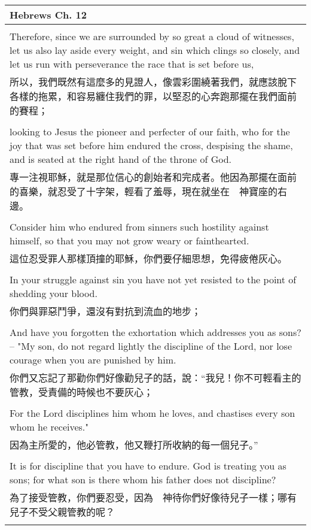 \documentclass{book}
\begin{document}
\begin{tabularx}{\textwidth}{p{}}
\hline
Hebrews Ch. 12 \\
\hline \\
Therefore, since we are surrounded by so great a cloud of witnesses, let us also lay aside every weight, and sin which clings so closely, and let us run with perseverance the race that is set before us, \\
所以，我們既然有這麼多的見證人，像雲彩圍繞著我們，就應該脫下各樣的拖累，和容易纏住我們的罪，以堅忍的心奔跑那擺在我們面前的賽程； \\ \\
looking to Jesus the pioneer and perfecter of our faith, who for the joy that was set before him endured the cross, despising the shame, and is seated at the right hand of the throne of God. \\
專一注視耶穌，就是那位信心的創始者和完成者。他因為那擺在面前的喜樂，就忍受了十字架，輕看了羞辱，現在就坐在　神寶座的右邊。 \\ \\
Consider him who endured from sinners such hostility against himself, so that you may not grow weary or fainthearted. \\
這位忍受罪人那樣頂撞的耶穌，你們要仔細思想，免得疲倦灰心。 \\ \\
In your struggle against sin you have not yet resisted to the point of shedding your blood. \\
你們與罪惡鬥爭，還沒有對抗到流血的地步； \\ \\
And have you forgotten the exhortation which addresses you as sons? -- "My son, do not regard lightly the discipline of the Lord, nor lose courage when you are punished by him. \\
你們又忘記了那勸你們好像勸兒子的話，說：“我兒！你不可輕看主的管教，受責備的時候也不要灰心； \\ \\
For the Lord disciplines him whom he loves, and chastises every son whom he receives." \\
因為主所愛的，他必管教，他又鞭打所收納的每一個兒子。” \\ \\
It is for discipline that you have to endure. God is treating you as sons; for what son is there whom his father does not discipline? \\
為了接受管教，你們要忍受，因為　神待你們好像待兒子一樣；哪有兒子不受父親管教的呢？ \\ \\

\end{tabularx}
\end{document}
